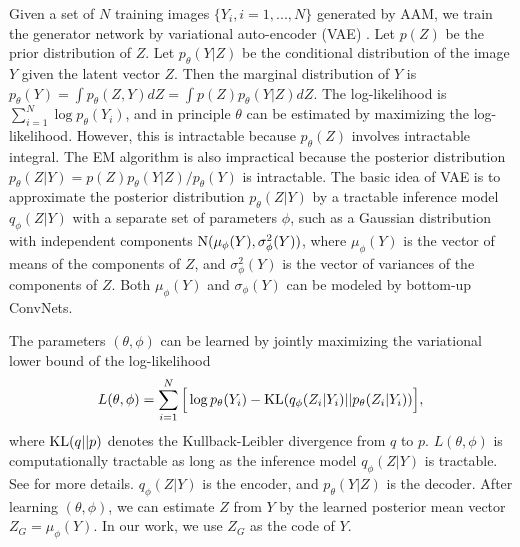 \documentclass{article}
\def\KL{{\rm KL}}
\begin{document}
Given a set of $N$ training images $\{Y_i, i = 1, ..., N\}$  generated by AAM, we train the generator network by variational auto-encoder (VAE) \cite{KingmaCoRR13,RezendeICML2014,salimans2015markov}. Let $p(Z)$ be the prior distribution of $Z$. Let $p_\theta(Y|Z)$ be the conditional distribution of the image $Y$ given the latent vector $Z$. Then the marginal distribution of $Y$ is $p_\theta(Y) = \int p_\theta(Z, Y) dZ = \int p(Z) p_\theta(Y|Z) dZ$. The log-likelihood is $\sum_{i=1}^{N} \log p_\theta(Y_i)$, and in principle $\theta$ can be estimated by maximizing the log-likelihood. However, this is intractable because $p_\theta(Z)$ involves intractable integral. The EM algorithm \cite{dempster1977maximum} is also impractical because the posterior distribution $p_\theta(Z|Y) = p(Z) p_\theta(Y|Z)/p_\theta(Y)$ is intractable. The basic idea of VAE is to approximate the posterior distribution $p_\theta(Z|Y)$ by a tractable inference model $q_\phi(Z|Y)$ with a separate set of parameters $\phi$, such as a Gaussian distribution with independent components ${\rm N}(\mu_\phi(Y), \sigma^2_\phi(Y))$, where $\mu_\phi(Y)$ is the vector of means of the components of $Z$, and $\sigma^2_\phi(Y)$ is the vector of variances of the components of $Z$. Both $\mu_\phi(Y)$ and $\sigma_\phi(Y)$ can be modeled by bottom-up ConvNets.

The parameters $(\theta, \phi)$ can be learned by jointly maximizing the variational lower bound of the log-likelihood
\begin{eqnarray}
\label{eqn4}
 L(\theta, \phi) = \sum_{i=1}^{N}\Big[ \log p_\theta(Y_i) - {\rm KL}(q_\phi(Z_i|Y_i)|| p_\theta(Z_i|Y_i)) \Big],
\end{eqnarray}
where ${\rm KL}(q||p)$ denotes the Kullback-Leibler divergence from $q$ to $p$. $L(\theta, \phi)$ is computationally tractable as long as the inference model $q_\phi(Z|Y)$ is tractable. See \cite{kingma2013auto} for more details. $q_\phi(Z|Y)$ is the encoder, and $p_\theta(Y|Z)$ is the decoder. After learning $(\theta, \phi)$, we can estimate $Z$ from $Y$ by the learned posterior mean vector $Z_G  =  \mu_\phi(Y)$. In our work, we use $Z_G$ as the code of $Y$.


\end{document}
